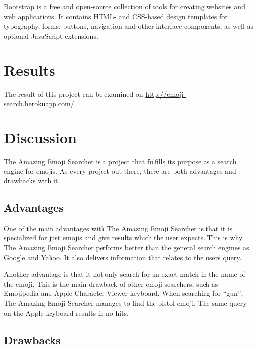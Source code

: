 \documentclass[a4paper]{article}
\begin{document}
Bootstrap is a free and open-source collection of tools for creating websites and web applications. It contains HTML- and CSS-based design templates for typography, forms, buttons, navigation and other interface components, as well as optional JavaScript extensions. 



\section{Results} %
\label{sec:results}

The result of this project can be examined on \url{http://emoji-search.herokuapp.com/}.


\section{Discussion} %
\label{sec:discussion}

The Amazing Emoji Searcher is a project that fulfills its purpose as a search engine for emojis. As every project out there, there are both advantages and drawbacks with it.

\subsection{Advantages} %
\label{sub:advantages}

One of the main advantages with The Amazing Emoji Searcher is that it is specialized for just emojis and give results which the user expects. This is why The Amazing Emoji Searcher performs better than the general search engines as Google and Yahoo. It also delivers information that relates to the users query.

Another advantage is that it not only search for an exact match in the name of the emoji. This is the main drawback of other emoji searchers, such as Emojipedia and Apple Character Viewer keyboard. When searching for ``gun'', The Amazing Emoji Searcher manages to find the pistol emoji. The same query on the Apple keyboard results in no hits.


\subsection{Drawbacks} %
\label{sub:drawbacks}
\end{document}
